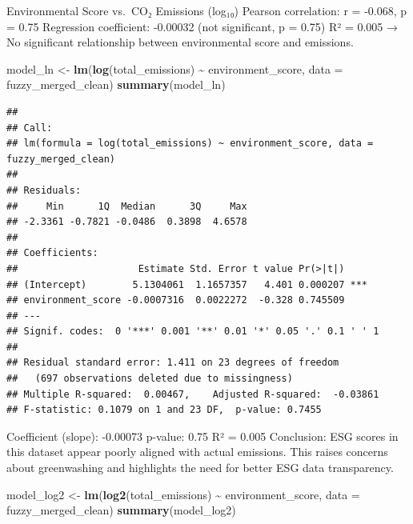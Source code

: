 \documentclass[
]{article}
\newenvironment{Shaded}{\begin{snugshade}}{\end{snugshade}}
\newcommand{\AttributeTok}[1]{\textcolor[rgb]{0.13,0.29,0.53}{#1}}
\newcommand{\FunctionTok}[1]{\textcolor[rgb]{0.13,0.29,0.53}{\textbf{#1}}}
\newcommand{\NormalTok}[1]{#1}
\newcommand{\OtherTok}[1]{\textcolor[rgb]{0.56,0.35,0.01}{#1}}
\newcommand{\SpecialCharTok}[1]{\textcolor[rgb]{0.81,0.36,0.00}{\textbf{#1}}}
\begin{document}
Environmental Score vs.~CO₂ Emissions (log₁₀) Pearson correlation: r =
-0.068, p = 0.75 Regression coefficient: -0.00032 (not significant, p =
0.75) R² = 0.005 → No significant relationship between environmental
score and emissions.

\begin{Shaded}
\begin{Highlighting}[]
\NormalTok{model\_ln }\OtherTok{\textless{}{-}} \FunctionTok{lm}\NormalTok{(}\FunctionTok{log}\NormalTok{(total\_emissions) }\SpecialCharTok{\textasciitilde{}}\NormalTok{ environment\_score, }\AttributeTok{data =}\NormalTok{ fuzzy\_merged\_clean)}
\FunctionTok{summary}\NormalTok{(model\_ln)}
\end{Highlighting}
\end{Shaded}

\begin{verbatim}
## 
## Call:
## lm(formula = log(total_emissions) ~ environment_score, data = fuzzy_merged_clean)
## 
## Residuals:
##     Min      1Q  Median      3Q     Max 
## -2.3361 -0.7821 -0.0486  0.3898  4.6578 
## 
## Coefficients:
##                     Estimate Std. Error t value Pr(>|t|)    
## (Intercept)        5.1304061  1.1657357   4.401 0.000207 ***
## environment_score -0.0007316  0.0022272  -0.328 0.745509    
## ---
## Signif. codes:  0 '***' 0.001 '**' 0.01 '*' 0.05 '.' 0.1 ' ' 1
## 
## Residual standard error: 1.411 on 23 degrees of freedom
##   (697 observations deleted due to missingness)
## Multiple R-squared:  0.00467,    Adjusted R-squared:  -0.03861 
## F-statistic: 0.1079 on 1 and 23 DF,  p-value: 0.7455
\end{verbatim}

Coefficient (slope): -0.00073 p-value: 0.75 R² = 0.005 Conclusion: ESG
scores in this dataset appear poorly aligned with actual emissions. This
raises concerns about greenwashing and highlights the need for better
ESG data transparency.

\begin{Shaded}
\begin{Highlighting}[]
\NormalTok{model\_log2 }\OtherTok{\textless{}{-}} \FunctionTok{lm}\NormalTok{(}\FunctionTok{log2}\NormalTok{(total\_emissions) }\SpecialCharTok{\textasciitilde{}}\NormalTok{ environment\_score, }\AttributeTok{data =}\NormalTok{ fuzzy\_merged\_clean)}
\FunctionTok{summary}\NormalTok{(model\_log2)}
\end{Highlighting}
\end{Shaded}
\end{document}

